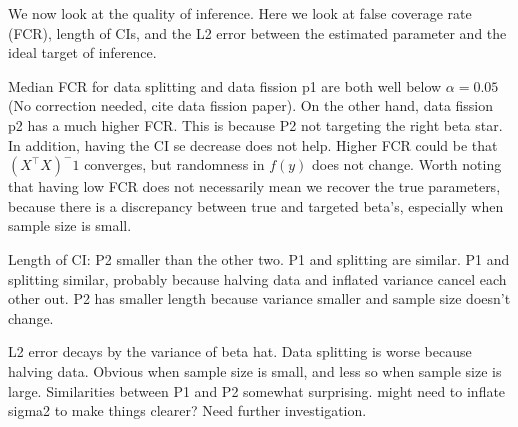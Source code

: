 We now look at the quality of inference. Here we look at false coverage rate (FCR), length of CIs, and the L2 error between the estimated parameter and the ideal target of inference.

Median FCR for data splitting and data fission p1 are both well below $\alpha = 0.05$ (No correction needed, cite data fission paper). On the other hand, data fission p2 has a much higher FCR. This is because P2 not targeting the right beta star. In addition, having the CI se decrease does not help. Higher FCR could be that $(X^\top X)^-1$ converges, but randomness in $f(y)$ does not change. Worth noting that having low FCR does not necessarily mean we recover the true parameters, because there is a discrepancy between true and targeted beta's, especially when sample size is small.

Length of CI: P2 smaller than the other two. P1 and splitting are similar. P1 and splitting similar, probably because halving data and inflated variance cancel each other out. P2 has smaller length because variance smaller and sample size doesn't change.

L2 error decays by the variance of beta hat. Data splitting is worse because halving data. Obvious when sample size is small, and less so when sample size is large. Similarities between P1 and P2 somewhat surprising. might need to inflate sigma2 to make things clearer? Need further investigation.